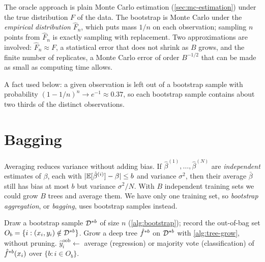 \begin{remark}
The oracle approach is plain Monte Carlo estimation (\cref{sec:mc-estimation}) under the true distribution $F$ of the data. The bootstrap is Monte Carlo under the \emph{empirical distribution} $\hat F_n$, which puts mass $1/n$ on each observation; sampling $n$ points from $\hat F_n$ is exactly sampling with replacement. Two approximations are involved: $\hat F_n\approx F$, a statistical error that does not shrink as $B$ grows, and the finite number of replicates, a Monte Carlo error of order $B^{-1/2}$ that can be made as small as computing time allows.
\end{remark}

A fact used below: a given observation is left out of a bootstrap sample with probability $(1-1/n)^n\to e^{-1}\approx0.37$, so each bootstrap sample contains about two thirds of the distinct observations.

\section{Bagging}\label{sec:bagging}

Averaging reduces variance without adding bias. If $\hat\beta^{(1)},\dots,\hat\beta^{(N)}$ are \emph{independent} estimates of $\beta$, each with $|\mathbb{E}[\hat\beta^{(i)}]-\beta|\le b$ and variance $\sigma^2$, then their average $\bar\beta$ still has bias at most $b$ but variance $\sigma^2/N$. With $B$ independent training sets we could grow $B$ trees and average them. We have only one training set, so \emph{bootstrap aggregation}, or \emph{bagging}, uses bootstrap samples instead.

\begin{algorithm}[H]
\caption{Bagging Trees}\label{alg:bagging}
\begin{algorithmic}[1]
  \State Draw a bootstrap sample $\mathcal{D}^{*b}$ of size $n$ (\cref{alg:bootstrap}); record the out-of-bag set $O_b=\{i:(x_i,y_i)\notin\mathcal{D}^{*b}\}$.
  \State Grow a deep tree $\hat f^{*b}$ on $\mathcal{D}^{*b}$ with \cref{alg:tree-grow}, without pruning.
\EndFor
{} 
  \State $\hat y_i^{\mathrm{oob}}\gets$ average (regression) or majority vote (classification) of $\hat f^{*b}(x_i)$ over $\{b:i\in O_b\}$.
\EndFor
{}
\end{algorithmic}
\end{algorithm}

